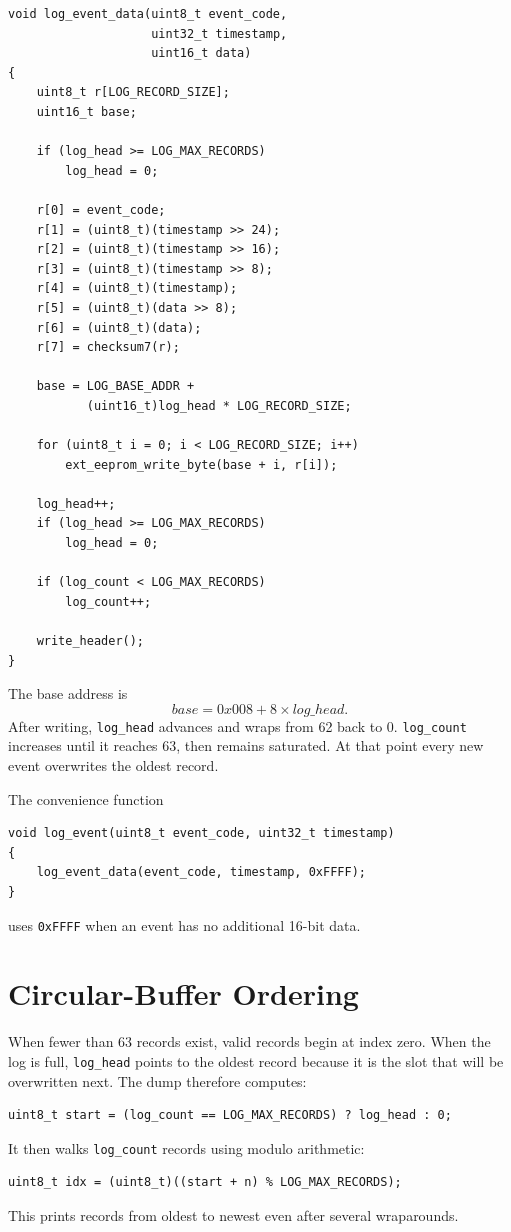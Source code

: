 \documentclass[11pt,a4paper]{article}
\begin{document}
\begin{lstlisting}[style=cstyle,caption={Record construction and circular-buffer update.}]
void log_event_data(uint8_t event_code,
                    uint32_t timestamp,
                    uint16_t data)
{
    uint8_t r[LOG_RECORD_SIZE];
    uint16_t base;

    if (log_head >= LOG_MAX_RECORDS)
        log_head = 0;

    r[0] = event_code;
    r[1] = (uint8_t)(timestamp >> 24);
    r[2] = (uint8_t)(timestamp >> 16);
    r[3] = (uint8_t)(timestamp >> 8);
    r[4] = (uint8_t)(timestamp);
    r[5] = (uint8_t)(data >> 8);
    r[6] = (uint8_t)(data);
    r[7] = checksum7(r);

    base = LOG_BASE_ADDR +
           (uint16_t)log_head * LOG_RECORD_SIZE;

    for (uint8_t i = 0; i < LOG_RECORD_SIZE; i++)
        ext_eeprom_write_byte(base + i, r[i]);

    log_head++;
    if (log_head >= LOG_MAX_RECORDS)
        log_head = 0;

    if (log_count < LOG_MAX_RECORDS)
        log_count++;

    write_header();
}
\end{lstlisting}

The base address is
\[
base=0x008+8\times log\_head.
\]
After writing, \texttt{log\_head} advances and wraps from 62 back to 0. \texttt{log\_count} increases until it reaches 63, then remains saturated. At that point every new event overwrites the oldest record.

The convenience function
\begin{lstlisting}[style=cstyle]
void log_event(uint8_t event_code, uint32_t timestamp)
{
    log_event_data(event_code, timestamp, 0xFFFF);
}
\end{lstlisting}
uses \texttt{0xFFFF} when an event has no additional 16-bit data.

\section{Circular-Buffer Ordering}
When fewer than 63 records exist, valid records begin at index zero. When the log is full, \texttt{log\_head} points to the oldest record because it is the slot that will be overwritten next. The dump therefore computes:
\begin{lstlisting}[style=cstyle]
uint8_t start = (log_count == LOG_MAX_RECORDS) ? log_head : 0;
\end{lstlisting}
It then walks \texttt{log\_count} records using modulo arithmetic:
\begin{lstlisting}[style=cstyle]
uint8_t idx = (uint8_t)((start + n) % LOG_MAX_RECORDS);
\end{lstlisting}
This prints records from oldest to newest even after several wraparounds.
\end{document}
